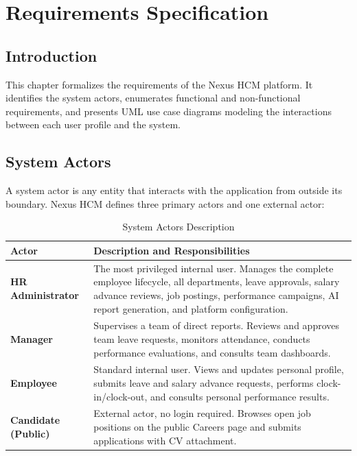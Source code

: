 \documentclass[12pt,a4paper]{report}
\begin{document}
\newpage

\chapter{Requirements Specification}

\section{Introduction}

This chapter formalizes the requirements of the Nexus HCM platform. It identifies the
system actors, enumerates functional and non-functional requirements, and presents UML use
case diagrams modeling the interactions between each user profile and the system.

\section{System Actors}

A system actor is any entity that interacts with the application from outside its boundary.
Nexus HCM defines three primary actors and one external actor:

\begin{table}[H]
\centering
\caption{System Actors Description}
\label{tab:actors}
\begin{tabular}{|C{3.2cm}|L{10cm}|}
\hline
{}
\textbf{Actor} & \textbf{Description and Responsibilities} \\
\hline
\textbf{HR Administrator} &
  The most privileged internal user. Manages the complete employee lifecycle, all
  departments, leave approvals, salary advance reviews, job postings, performance
  campaigns, AI report generation, and platform configuration. \\
\hline
\textbf{Manager} &
  Supervises a team of direct reports. Reviews and approves team leave requests,
  monitors attendance, conducts performance evaluations, and consults team
  dashboards. \\
\hline
\textbf{Employee} &
  Standard internal user. Views and updates personal profile, submits leave and
  salary advance requests, performs clock-in/clock-out, and consults personal
  performance results. \\
\hline
\textbf{Candidate (Public)} &
  External actor, no login required. Browses open job positions on the public
  Careers page and submits applications with CV attachment. \\
\hline
\end{tabular}
\end{table}
\end{document}
